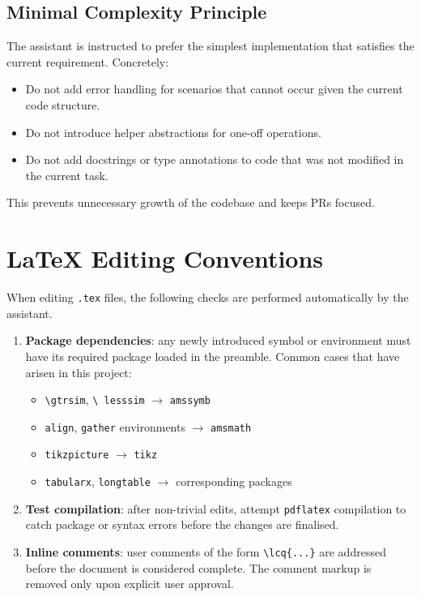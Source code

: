 \documentclass[11pt]{article}
\newcommand{\lcq}[1]{\textcolor{red}{#1}}
\begin{document}
\subsection{Minimal Complexity Principle}

The assistant is instructed to prefer the simplest implementation that
satisfies the current requirement.  Concretely:
\begin{itemize}[leftmargin=1.5em]
  \item Do not add error handling for scenarios that cannot occur given
        the current code structure.
  \item Do not introduce helper abstractions for one-off operations.
  \item Do not add docstrings or type annotations to code that was not
        modified in the current task.
\end{itemize}
This prevents unnecessary growth of the codebase and keeps PRs focused.

\section{\LaTeX{} Editing Conventions}
\label{sec:latex}

When editing \texttt{.tex} files, the following checks are performed
automatically by the assistant.

\begin{enumerate}[leftmargin=1.5em]
  \item \textbf{Package dependencies}: any newly introduced symbol or
        environment must have its required package loaded in the
        preamble.  Common cases that have arisen in this project:
        \begin{itemize}
          \item \texttt{\textbackslash gtrsim}, \texttt{\textbackslash
                lesssim} $\to$ \texttt{amssymb}
          \item \texttt{align}, \texttt{gather} environments $\to$
                \texttt{amsmath}
          \item \texttt{tikzpicture} $\to$ \texttt{tikz}
          \item \texttt{tabularx}, \texttt{longtable} $\to$
                corresponding packages
        \end{itemize}
  \item \textbf{Test compilation}: after non-trivial edits, attempt
        \texttt{pdflatex} compilation to catch package or syntax errors
        before the changes are finalised.
  \item \textbf{Inline comments}: user comments of the form
        \verb|\lcq{...}| are addressed before the document is
        considered complete.  The comment markup is removed only upon
        explicit user approval.
\end{enumerate}
\end{document}
